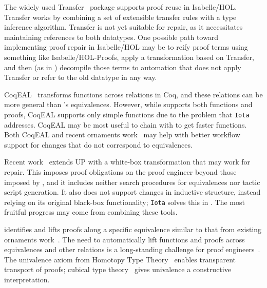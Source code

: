 
The widely used Transfer~\cite{Huffman2013} package supports proof reuse in Isabelle/HOL. %
Transfer works by combining a set of extensible transfer rules with a type inference algorithm.
Transfer is not yet suitable for repair, as it necessitates maintaining references to both datatypes.
One possible path toward implementing proof repair in Isabelle/HOL may be to reify proof terms using something like
Isabelle/HOL-Proofs, apply a transformation based on Transfer, and then (as in \toolname) decompile those terms to automation that does not apply Transfer or refer to the old datatype in any way.

CoqEAL~\cite{cohen:hal-01113453} transforms functions across relations in Coq,
and these relations can be more general than \toolnamec's equivalences.
However, while \toolnamec supports both functions and proofs, CoqEAL supports only simple functions
due to the problem that \lstinline{Iota} addresses.
CoqEAL may be most useful to chain with \toolnamec to get faster functions.
Both CoqEAL and recent ornaments work~\cite{williamsphd} may help with
better workflow support for changes that do not correspond to equivalences.

Recent work~\cite{tabareau2019marriage} extends UP with 
a white-box transformation that may work for repair.
This imposes proof obligations on the proof engineer beyond those imposed by \toolname,
and it includes neither search procedures for equivalences nor tactic script generation.
It also does not support changes in inductive structure,
instead relying on its original black-box functionality;
\lstinline{Iota} solves this in \toolname. %
The most fruitful progress may come from combining these tools. %


\toolnameb identifies and lifts proofs along a specific equivalence 
similar to that from existing ornaments work~\cite{ko2016programming}.
The need to automatically lift functions and proofs
across equivalences and other relations is a long-standing challenge for proof 
engineers~\cite{magaud2000changing, barthe2001type, magaud2003changing, huffman2013lifting, zimmermann2015automatic, cohen:hal-01414881}.
The univalence axiom from Homotopy Type Theory~\cite{univalent2013homotopy} enables transparent transport of proofs;
cubical type theory~\cite{cohen2016cubical} gives univalence a constructive interpretation. 

